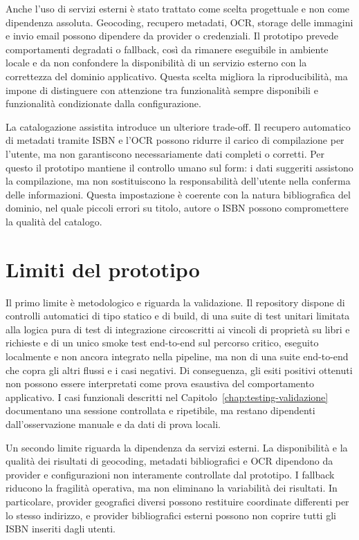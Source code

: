 Anche l'uso di servizi esterni è stato trattato come scelta progettuale e non come dipendenza assoluta. Geocoding, recupero metadati, OCR, storage delle immagini e invio email possono dipendere da provider o credenziali. Il prototipo prevede comportamenti degradati o fallback, così da rimanere eseguibile in ambiente locale e da non confondere la disponibilità di un servizio esterno con la correttezza del dominio applicativo. Questa scelta migliora la riproducibilità, ma impone di distinguere con attenzione tra funzionalità sempre disponibili e funzionalità condizionate dalla configurazione.

La catalogazione assistita introduce un ulteriore trade-off. Il recupero automatico di metadati tramite ISBN e l'OCR possono ridurre il carico di compilazione per l'utente, ma non garantiscono necessariamente dati completi o corretti. Per questo il prototipo mantiene il controllo umano sul form: i dati suggeriti assistono la compilazione, ma non sostituiscono la responsabilità dell'utente nella conferma delle informazioni. Questa impostazione è coerente con la natura bibliografica del dominio, nel quale piccoli errori su titolo, autore o ISBN possono compromettere la qualità del catalogo.

\section{Limiti del prototipo}
\label{sec:limiti-prototipo}

Il primo limite è metodologico e riguarda la validazione. Il repository dispone di controlli automatici di tipo statico e di build, di una suite di test unitari limitata alla logica pura di test di integrazione circoscritti ai vincoli di proprietà su libri e richieste e di un unico smoke test end-to-end sul percorso critico, eseguito localmente e non ancora integrato nella pipeline, ma non di una suite end-to-end che copra gli altri flussi e i casi negativi. Di conseguenza, gli esiti positivi ottenuti non possono essere interpretati come prova esaustiva del comportamento applicativo. I casi funzionali descritti nel Capitolo~\ref{chap:testing-validazione} documentano una sessione controllata e ripetibile, ma restano dipendenti dall'osservazione manuale e da dati di prova locali.

Un secondo limite riguarda la dipendenza da servizi esterni. La disponibilità e la qualità dei risultati di geocoding, metadati bibliografici e OCR dipendono da provider e configurazioni non interamente controllate dal prototipo. I fallback riducono la fragilità operativa, ma non eliminano la variabilità dei risultati. In particolare, provider geografici diversi possono restituire coordinate differenti per lo stesso indirizzo, e provider bibliografici esterni possono non coprire tutti gli ISBN inseriti dagli utenti.


